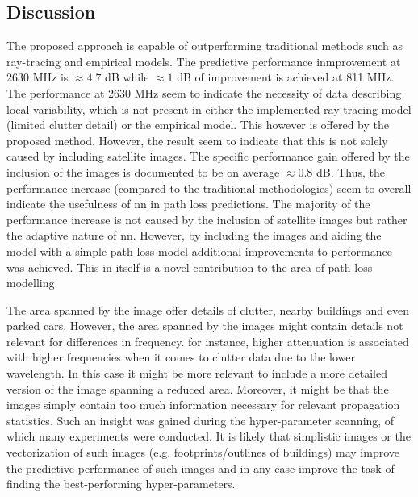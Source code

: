 \subsection{Discussion}
The proposed approach is capable of outperforming traditional methods such as ray-tracing and empirical models. The predictive performance inmprovement at $2630$ MHz is $\approx 4.7$ dB while $\approx 1$ dB of improvement is achieved at 811 MHz. The performance at 2630 MHz seem to indicate the necessity of data describing local variability, which is not present in either the implemented ray-tracing model (limited clutter detail) or the empirical model. This however is offered by the proposed method. However, the result seem to indicate that this is not solely caused by including satellite images. The specific performance gain offered by the inclusion of the images is documented to be on average $\approx 0.8$ dB. Thus, the performance increase (compared to the traditional methodologies) seem to overall indicate the usefulness of \gls{nn} in path loss predictions. The majority of the performance increase is not caused by the inclusion of satellite images but rather the adaptive nature of \gls{nn}. However, by including the images and aiding the model with a simple path loss model additional improvements to performance was achieved. This in itself is a novel contribution to the area of path loss modelling.

The area spanned by the image offer details of clutter, nearby buildings and even parked cars. However, the area spanned by the images might contain details not relevant for differences in frequency. for instance, higher attenuation is associated with higher frequencies when it comes to clutter data due to the lower wavelength. In this case it might be more relevant to include a more detailed version of the image spanning a reduced area. Moreover, it might be that the images simply contain too much information necessary for relevant propagation statistics. Such an insight was gained during the hyper-parameter scanning, of which many experiments were conducted. It is likely that simplistic images or the vectorization of such images (e.g. footprints/outlines of buildings) may improve the predictive performance of such images and in any case improve the task of finding the best-performing hyper-parameters.

